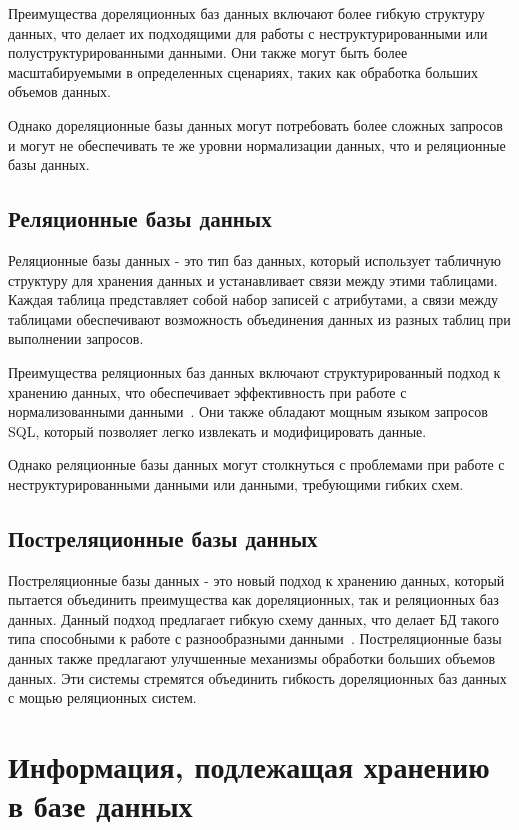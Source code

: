 \documentclass{bmstu}
\begin{document}
Преимущества дореляционных баз данных включают более гибкую структуру данных, что делает их подходящими для работы с неструктурированными или полуструктурированными данными. Они также могут быть более масштабируемыми в определенных сценариях, таких как обработка больших объемов данных.

Однако дореляционные базы данных могут потребовать более сложных запросов и могут не обеспечивать те же уровни нормализации данных, что и реляционные базы данных.

\subsection{Реляционные базы данных}

Реляционные базы данных - это тип баз данных, который использует табличную структуру для хранения данных и устанавливает связи между этими таблицами. Каждая таблица представляет собой набор записей с атрибутами, а связи между таблицами обеспечивают возможность объединения данных из разных таблиц при выполнении запросов.

Преимущества реляционных баз данных включают структурированный подход к хранению данных, что обеспечивает эффективность при работе с нормализованными данными~\cite{SQL}. Они также обладают мощным языком запросов SQL, который позволяет легко извлекать и модифицировать данные.

Однако реляционные базы данных могут столкнуться с проблемами при работе с неструктурированными данными или данными, требующими гибких схем.

\subsection{Постреляционные базы данных}

Постреляционные базы данных - это новый подход к хранению данных, который пытается объединить преимущества как дореляционных, так и реляционных баз данных. Данный подход предлагает гибкую схему данных, что делает БД такого типа способными к работе с разнообразными данными~\cite{PostSQL}. Постреляционные базы данных также предлагают улучшенные механизмы обработки больших объемов данных. Эти системы стремятся объединить гибкость дореляционных баз данных с мощью реляционных систем.

\section{Информация, подлежащая хранению в базе данных}
\end{document}
